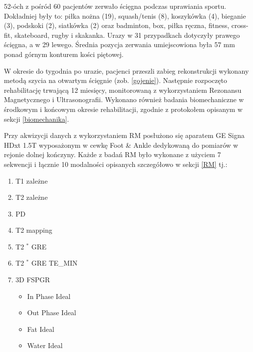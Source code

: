 52-óch z pośród 60 pacjentów zerwało ścięgna podczas uprawiania sportu. Dokładniej były to: piłka nożna (19), squash/tenis (8), koszykówka (4), bieganie (3), podskoki (2), siatkówka (2) oraz badminton, box, piłka ręczna, fitness, cross-fit, skateboard, rugby i skakanka. Urazy w 31 przypadkach dotyczyły prawego ścięgna, a w 29 lewego. Średnia pozycja zerwania umiejscowiona była 57 mm ponad górnym konturem kości piętowej.

W okresie do tygodnia po urazie, pacjenci przeszli zabieg rekonstrukcji wykonany metodą szycia na otwartym ścięgnie (zob. \ref{gojenie}). Następnie rozpoczęto rehabilitację trwającą 12 miesięcy, monitorowaną z wykorzystaniem Rezonansu Magnetycznego i Ultrasonografii. Wykonano również badania biomechaniczne w środkowym i końcowym okresie rehabilitacji, zgodnie z protokołem opisanym w sekcji \ref{biomechanika}.

Przy akwizycji danych z wykorzystaniem RM posłużono się aparatem GE Signa HDxt 1.5T wyposażonym w cewkę Foot \& Ankle dedykowaną do pomiarów w rejonie dolnej kończyny. Każde z badań RM było wykonane z użyciem 7 sekwencji i łącznie 10 modalności opisanych szczegółowo w sekcji \ref{RM} tj.:
\begin{enumerate}
	\item T1 zależne
	\item T2 zależne
	\item PD
	\item T2 mapping
	\item T2 $^\ast$ GRE
	\item T2 $^\ast$ GRE TE\_MIN
	\item 3D FSPGR
	\begin{itemize}
		\item In Phase Ideal
		\item Out Phase Ideal
		\item Fat Ideal
		\item Water Ideal 
	\end{itemize}
\end{enumerate}

